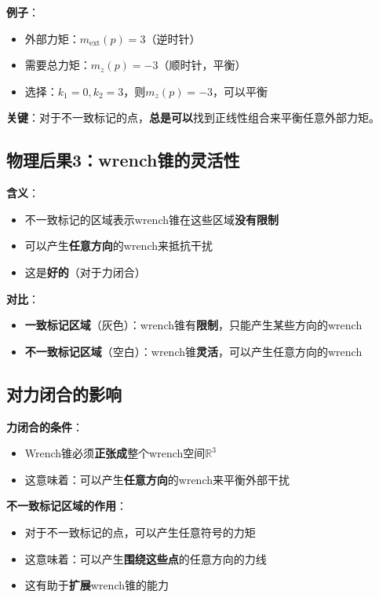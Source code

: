 \documentclass[12pt,a4paper]{article}
\begin{document}
\textbf{例子}：
\begin{itemize}
\item 外部力矩：$m_{\text{ext}}(p) = 3$（逆时针）
\item 需要总力矩：$m_z(p) = -3$（顺时针，平衡）
\item 选择：$k_1 = 0, k_2 = 3$，则$m_z(p) = -3$，可以平衡
\end{itemize}

\textbf{关键}：对于不一致标记的点，\textbf{总是可以}找到正线性组合来平衡任意外部力矩。

\subsection{物理后果3：wrench锥的灵活性}

\textbf{含义}：
\begin{itemize}
\item 不一致标记的区域表示wrench锥在这些区域\textbf{没有限制}
\item 可以产生\textbf{任意方向}的wrench来抵抗干扰
\item 这是\textbf{好的}（对于力闭合）
\end{itemize}

\textbf{对比}：
\begin{itemize}
\item \textbf{一致标记区域}（灰色）：wrench锥有\textbf{限制}，只能产生某些方向的wrench
\item \textbf{不一致标记区域}（空白）：wrench锥\textbf{灵活}，可以产生任意方向的wrench
\end{itemize}

\subsection{对力闭合的影响}

\textbf{力闭合的条件}：
\begin{itemize}
\item Wrench锥必须\textbf{正张成}整个wrench空间$\mathbb{R}^3$
\item 这意味着：可以产生\textbf{任意方向}的wrench来平衡外部干扰
\end{itemize}

\textbf{不一致标记区域的作用}：
\begin{itemize}
\item 对于不一致标记的点，可以产生任意符号的力矩
\item 这意味着：可以产生\textbf{围绕这些点}的任意方向的力线
\item 这有助于\textbf{扩展}wrench锥的能力
\end{itemize}
\end{document}
